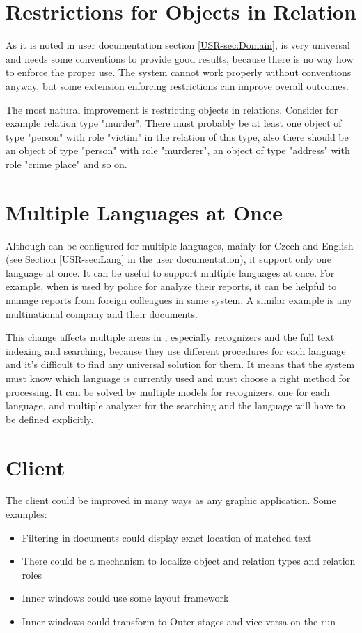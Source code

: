 \section{Restrictions for Objects in Relation}
As it is noted in user documentation section \ref{USR-sec:Domain},
\textan{} is very universal and needs some conventions to provide good results,
because there is no way how to enforce the proper use. The system cannot work
properly without conventions anyway, but some extension enforcing restrictions
can improve overall outcomes.

The most natural improvement is restricting objects in relations. Consider for
example relation type "murder". There must probably be at least one object of
type "person" with role "victim" in the relation of this type, also there
should be an object of type "person" with role "murderer", an object of type
"address" with role "crime place" and so on.

\section{Multiple Languages at Once}
Although \textan{} can be configured for multiple languages, mainly for Czech
and English (see Section \ref{USR-sec:Lang} in the user documentation), it support
only one language at once. It can be useful to support multiple languages at once.
For example, when \textan{} is used by police for analyze their reports, it can
be helpful to manage reports from foreign colleagues in same system. A similar
example is any multinational company and their documents.

This change affects multiple areas in \textan{}, especially recognizers and
the full text indexing and searching, because they use different procedures for
each language and it's difficult to find any universal solution for them. It means
that the system must know which language is currently used and must choose a right
method for processing. It can be solved by multiple models for recognizers, one
for each language, and multiple analyzer for the searching and the language will
have to be defined explicitly.

\section{Client}
The \textan{} client could be improved in many ways as any graphic application.
Some examples:

\begin{itemize}
	\item Filtering in documents could display exact location of matched text
	\item There could be a mechanism to localize object and relation types and
	relation roles
	\item Inner windows could use some layout framework
	\item Inner windows could transform to Outer stages and vice-versa on the
	run
\end{itemize}
